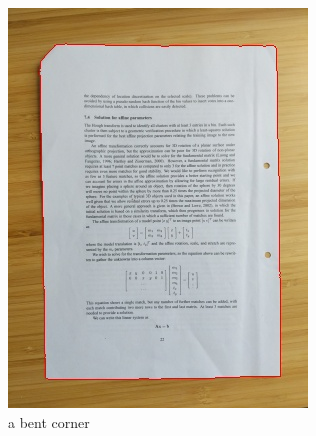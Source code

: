 \documentclass[bibliography=totoc]{scrartcl}
\begin{document}
\begin{figure}[H]
\begin{subfigure}[t]{0.3\linewidth}
		\includegraphics[width=\linewidth]{imgs/contours/bent_corner.jpg}
		\caption{a bent corner}
		\label{subfig:bent_corner}
	\end{subfigure}
	\hspace{0.02\textwidth}
	\begin{subfigure}[t]{0.3\linewidth}

\end{subfigure}
\end{figure}
\end{document}
